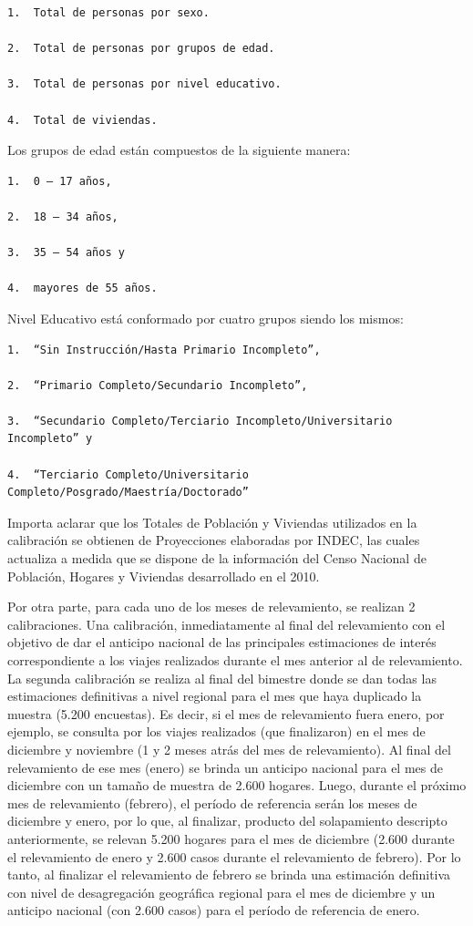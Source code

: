 \documentclass[
  openany]{book}
\begin{document}
\begin{verbatim}
1.  Total de personas por sexo.

2.  Total de personas por grupos de edad. 

3.  Total de personas por nivel educativo.

4.  Total de viviendas.
\end{verbatim}

Los grupos de edad están compuestos de la siguiente manera:

\begin{verbatim}
1.  0 – 17 años, 

2.  18 – 34 años, 

3.  35 – 54 años y 

4.  mayores de 55 años. 
\end{verbatim}

Nivel Educativo está conformado por cuatro grupos siendo los mismos:

\begin{verbatim}
1.  “Sin Instrucción/Hasta Primario Incompleto”, 

2.  “Primario Completo/Secundario Incompleto”, 

3.  “Secundario Completo/Terciario Incompleto/Universitario Incompleto” y

4.  “Terciario Completo/Universitario Completo/Posgrado/Maestría/Doctorado” 
\end{verbatim}

Importa aclarar que los Totales de Población y Viviendas utilizados en la calibración se obtienen de Proyecciones elaboradas por INDEC, las cuales actualiza a medida que se dispone de la información del Censo Nacional de Población, Hogares y Viviendas desarrollado en el 2010.

Por otra parte, para cada uno de los meses de relevamiento, se realizan 2 calibraciones. Una calibración, inmediatamente al final del relevamiento con el objetivo de dar el anticipo nacional de las principales estimaciones de interés correspondiente a los viajes realizados durante el mes anterior al de relevamiento. La segunda calibración se realiza al final del bimestre donde se dan todas las estimaciones definitivas a nivel regional para el mes que haya duplicado la muestra (5.200 encuestas). Es decir, si el mes de relevamiento fuera enero, por ejemplo, se consulta por los viajes realizados (que finalizaron) en el mes de diciembre y noviembre (1 y 2 meses atrás del mes de relevamiento). Al final del relevamiento de ese mes (enero) se brinda un anticipo nacional para el mes de diciembre con un tamaño de muestra de 2.600 hogares. Luego, durante el próximo mes de relevamiento (febrero), el período de referencia serán los meses de diciembre y enero, por lo que, al finalizar, producto del solapamiento descripto anteriormente, se relevan 5.200 hogares para el mes de diciembre (2.600 durante el relevamiento de enero y 2.600 casos durante el relevamiento de febrero). Por lo tanto, al finalizar el relevamiento de febrero se brinda una estimación definitiva con nivel de desagregación geográfica regional para el mes de diciembre y un anticipo nacional (con 2.600 casos) para el período de referencia de enero.
\end{document}
